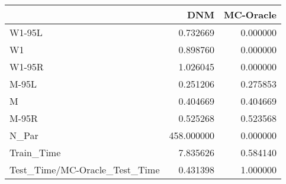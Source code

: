 \begin{tabular}{lrr}
\toprule
{} &         DNM &  MC-Oracle \\
\midrule
W1-95L                        &    0.732669 &   0.000000 \\
W1                            &    0.898760 &   0.000000 \\
W1-95R                        &    1.026045 &   0.000000 \\
M-95L                         &    0.251206 &   0.275853 \\
M                             &    0.404669 &   0.404669 \\
M-95R                         &    0.525268 &   0.523568 \\
N\_Par                         &  458.000000 &   0.000000 \\
Train\_Time                    &    7.835626 &   0.584140 \\
Test\_Time/MC-Oracle\_Test\_Time &    0.431398 &   1.000000 \\
\bottomrule
\end{tabular}
